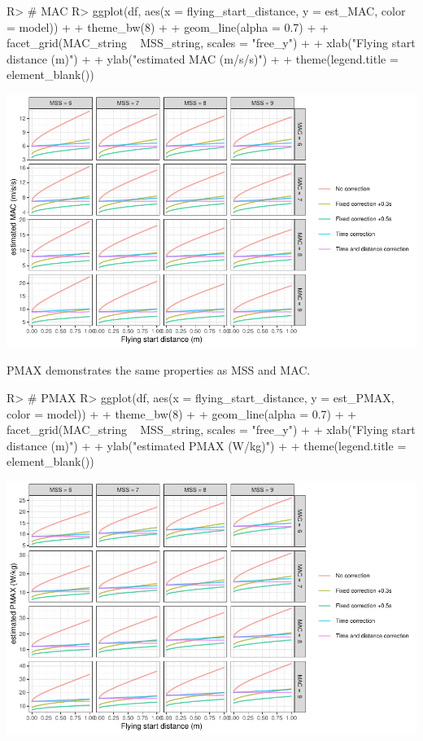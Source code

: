 \documentclass[
]{jss}
\begin{document}
\begin{CodeChunk}
\begin{CodeInput}
R> # MAC
R> ggplot(df, aes(x = flying_start_distance, y = est_MAC, color = model)) +
+   theme_bw(8) +
+   geom_line(alpha = 0.7) +
+   facet_grid(MAC_string ~ MSS_string, scales = "free_y") +
+   xlab("Flying start distance (m)") +
+   ylab("estimated MAC (m/s/s)") +
+   theme(legend.title = element_blank())
\end{CodeInput}


\begin{center}\includegraphics[width=1\linewidth]{paper_files/figure-latex/unnamed-chunk-36-1} \end{center}

\end{CodeChunk}

PMAX demonstrates the same properties as MSS and MAC.

\begin{CodeChunk}
\begin{CodeInput}
R> # PMAX
R> ggplot(df, aes(x = flying_start_distance, y = est_PMAX, color = model)) +
+   theme_bw(8) +
+   geom_line(alpha = 0.7) +
+   facet_grid(MAC_string ~ MSS_string, scales = "free_y") +
+   xlab("Flying start distance (m)") +
+   ylab("estimated PMAX (W/kg)") +
+   theme(legend.title = element_blank())
\end{CodeInput}


\begin{center}\includegraphics[width=1\linewidth]{paper_files/figure-latex/unnamed-chunk-37-1} \end{center}

\end{CodeChunk}
\end{document}
